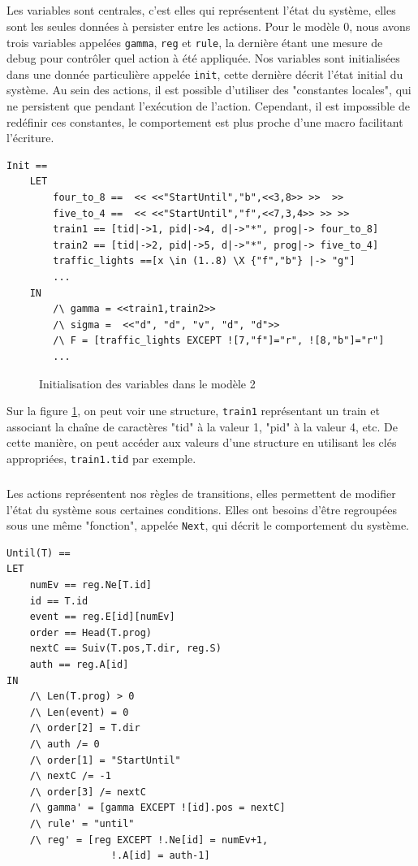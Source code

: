 \documentclass[oneside, a4paper, 11pt]{book}
\begin{document}
\subparagraph{} Les variables sont centrales, c'est elles qui représentent l'état du système, elles sont les seules données à persister entre les actions. Pour le modèle 0, nous avons trois variables appelées \texttt{gamma}, \texttt{reg} et \texttt{rule}, la dernière étant une mesure de debug pour contrôler quel action à été appliquée.
Nos variables sont initialisées dans une donnée particulière appelée \texttt{init}, cette dernière décrit l'état initial du système.
Au sein des actions, il est possible d'utiliser des "constantes locales", qui ne persistent que pendant l'exécution de l'action. Cependant, il est impossible de redéfinir ces constantes, le comportement est plus proche d'une macro facilitant l'écriture.


\begin{verbatim}
Init == 
	LET 
		four_to_8 ==  << <<"StartUntil","b",<<3,8>> >>  >>
		five_to_4 ==  << <<"StartUntil","f",<<7,3,4>> >> >>
		train1 == [tid|->1, pid|->4, d|->"*", prog|-> four_to_8]
		train2 == [tid|->2, pid|->5, d|->"*", prog|-> five_to_4]
		traffic_lights ==[x \in (1..8) \X {"f","b"} |-> "g"]
		...
	IN
		/\ gamma = <<train1,train2>>
		/\ sigma =  <<"d", "d", "v", "d", "d">> 
		/\ F = [traffic_lights EXCEPT ![7,"f"]="r", ![8,"b"]="r"]
		...
\end{verbatim}

\begin{figure}[h]
	\caption{Initialisation des variables dans le modèle 2}
	\label{fig:initTLA}
\end{figure}

Sur la figure \ref{fig:initTLA}, on peut voir une structure, \texttt{train1} représentant un train et associant la chaîne de caractères "tid" à la valeur 1, "pid" à la valeur 4, etc. De cette manière, on peut accéder aux valeurs d'une structure en utilisant les clés appropriées, \texttt{train1.tid} par exemple.


\subparagraph{} Les actions représentent nos règles de transitions, elles permettent de modifier l'état du système sous certaines conditions. Elles ont besoins d'être regroupées sous une même "fonction", appelée \texttt{Next}, qui décrit le comportement du système.

\begin{verbatim}
Until(T) == 
LET
	numEv == reg.Ne[T.id]
	id == T.id
	event == reg.E[id][numEv]
	order == Head(T.prog)
	nextC == Suiv(T.pos,T.dir, reg.S)
	auth == reg.A[id]
IN
	/\ Len(T.prog) > 0
	/\ Len(event) = 0
	/\ order[2] = T.dir 
	/\ auth /= 0
	/\ order[1] = "StartUntil"
	/\ nextC /= -1
	/\ order[3] /= nextC
	/\ gamma' = [gamma EXCEPT ![id].pos = nextC]
	/\ rule' = "until"
	/\ reg' = [reg EXCEPT !.Ne[id] = numEv+1,
			      !.A[id] = auth-1]
\end{verbatim}
\end{document}
